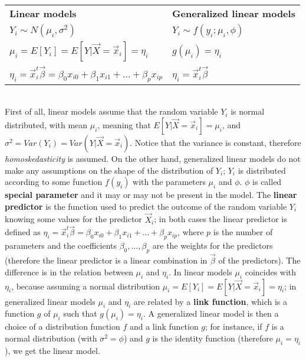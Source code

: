     \begin{tabularx}{1\textwidth} { 
    >{\centering\arraybackslash}X 
    >{\centering\arraybackslash}X }

    \textbf{Linear models} & 
    \textbf{Generalized linear models} \\

    $Y_i \sim N(\mu_i, \sigma^2)$ & 
    $Y_i \sim f(y_i; \mu_i, \phi)$ \\

    $\mu_i = E[Y_i] = E[Y|\vec{X} = \vec{x}_i] = \eta_i$ & 
    $g(\mu_i) = \eta_i$ \\

    $\eta_i = \vec{x}_i^t\vec{\beta} = \beta_0x_{i0} + \beta_1x_{i1} + \dots + \beta_px_{ip}$ & 
    $\eta_i = \vec{x}_i^t\vec{\beta}$  \\
    \end{tabularx}
\\
    First of all, linear models assume that the random variable $Y_i$ is normal distributed, with mean $\mu_i$, meaning that $E[Y|\vec{X}=\vec{x}_i] = \mu_i$, and $\sigma^2 = Var(Y_i) = Var(Y|\vec{X}=\vec{x}_i)$. Notice that the variance is constant, therefore  \emph{homoskedasticity} is assumed. On the other hand, generalized linear models do not make any assumptions on the shape of the distribution of $Y_i$; $Y_i$ is distributed according to some function $f(y_i)$ with the parameters $\mu_i$ and $\phi$. $\phi$ is called \textbf{special parameter} and it may or may not be present in the model.
    The \textbf{linear predictor} is the function used to predict the outcome of the random variable $Y_i$ knowing some values for the predictor $\vec{X}_i$; in both cases the linear predictor is defined as $\eta_i = \vec{x}_i^t\vec{\beta} = \beta_0x_{i0} + \beta_1x_{i1} + \dots + \beta_px_{ip}$, where $p$ is the number of parameters and the coefficients $\beta_0, \dots, \beta_p$ are the weights for the predictors (therefore the linear predictor is a linear combination in $\vec{\beta}$ of the predictors). The difference is in the relation between $\mu_i$ and $\eta_i$. In linear models $\mu_i$ coincides with $\eta_i$, because assuming a normal distribution $\mu_i = E[Y_i] = E[Y|\vec{X} = \vec{x}_i] = \eta_i$; in generalized linear models $\mu_i$ and $\eta_i$ are related by a \textbf{link function}, which is a function $g$ of $\mu_i$ such that $g(\mu_i) = \eta_i$.
    A generalized linear model is then a choice of a distribution function $f$ and a link function $g$; for instance, if $f$ is a normal distribution (with $\sigma^2 = \phi$) and $g$ is the identity function (therefore $\mu_i = \eta_i$), we get the linear model. 
  
